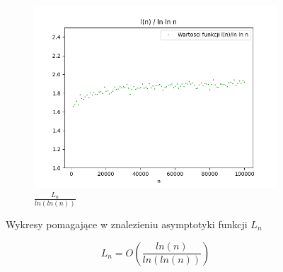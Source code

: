 \documentclass{report}
\begin{document}
\begin{figure}[H]
\begin{subfigure}{.5\textwidth}
            \centering
            \includegraphics[width=1.2\linewidth]{plotlnfunc3.png}
            \caption{\( \frac{L_n}{ln(ln(n))} \)}
            \label{fig:plotlnfunc3}
          \end{subfigure}
        \caption{Wykresy pomagające w znalezieniu asymptotyki funkcji \(L_n\)}
        \label{fig:ln}
    \end{figure}

\[L_n=O(\frac{ln(n)}{ln(ln(n))})\]
\end{document}
